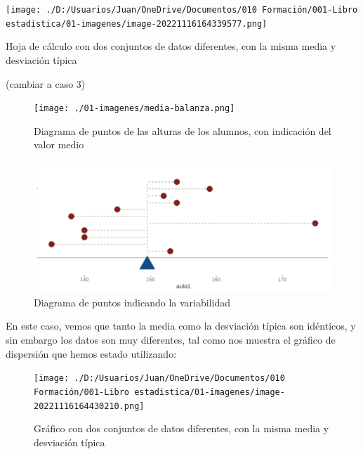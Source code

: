 \documentclass[
  letterpaper,
]{scrbook}
\begin{document}
\begin{marginfigure}

{\centering \texttt{[image: ./D:/Usuarios/Juan/OneDrive/Documentos/010 Formación/001-Libro estadistica/01-imagenes/image-20221116164339577.png]}

}

\caption{Hoja de cálculo con dos conjuntos de datos diferentes, con la
misma media y desviación típica}

\end{marginfigure}

(cambiar a caso 3)

\begin{figure}

{\centering \texttt{[image: ./01-imagenes/media-balanza.png]}

}

\caption{Diagrama de puntos de las alturas de los alumnos, con
indicación del valor medio}

\end{figure}

\begin{figure}

{\centering \includegraphics{./01-imagenes/plot_varianzas.png}

}

\caption{Diagrama de puntos indicando la variabilidad}

\end{figure}

En este caso, vemos que tanto la media como la desviación típica son
idénticos, y sin embargo los datos son muy diferentes, tal como nos
muestra el gráfico de dispersión que hemos estado utilizando:

\begin{figure}

{\centering \texttt{[image: ./D:/Usuarios/Juan/OneDrive/Documentos/010 Formación/001-Libro estadistica/01-imagenes/image-20221116164430210.png]}

}

\caption{Gráfico con dos conjuntos de datos diferentes, con la misma
media y desviación típica}

\end{figure}
\end{document}
